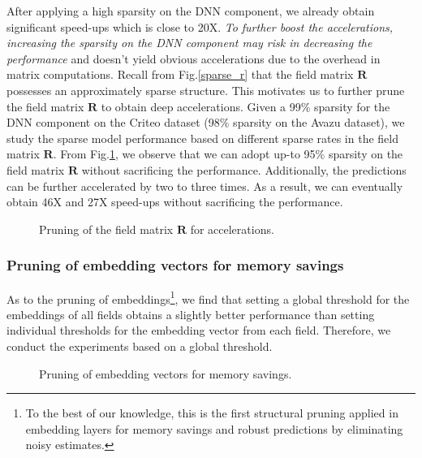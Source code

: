 \documentclass[sigconf]{acmart}
\begin{document}
After applying a high sparsity on the DNN component, we already obtain significant speed-ups which is close to 20X. \emph{To further boost the accelerations, increasing the sparsity on the DNN component may risk in decreasing the performance} and doesn't yield obvious accelerations due to the overhead in matrix computations. Recall from Fig.\ref{sparse_r} that the field matrix $\bm{R}$ possesses an approximately sparse structure. This motivates us to further prune the field matrix $\bm{R}$ to obtain deep accelerations. Given a 99\% sparsity for the DNN component on the Criteo dataset (98\% sparsity on the Avazu dataset), we study the sparse model performance based on different sparse rates in the field matrix $\bm{R}$. From Fig.\ref{prune_fig_Rs}, we observe that we can adopt up-to 95\% sparsity on the field matrix $\bm{R}$ without sacrificing the performance. Additionally, the predictions can be further accelerated by two to three times. As a result, we can eventually obtain 46X and 27X speed-ups without sacrificing the performance. 

\begin{figure}[h!]
\centering
\vspace{-0.1in}
  \vspace{-0.05in}
  \caption{Pruning of the field matrix $\bm{R}$ for accelerations. }
   \label{prune_fig_Rs}
\end{figure}





\subsubsection{\textbf{Pruning of embedding vectors for memory savings}}
As to the pruning of embeddings\footnote{To the best of our knowledge, this is the first structural pruning applied in embedding layers for memory savings and robust predictions by eliminating noisy estimates.}, we find that setting a global threshold for the embeddings of all fields obtains a slightly better performance than setting individual thresholds for the embedding vector from each field. Therefore, we conduct the experiments based on a global threshold. 

\begin{figure}[h!]
\centering
\vspace{-0.1in}
  \label{fig: fm2a} 
  \label{fig: avazu_2b}
   \vspace{-0.05in}
  \caption{Pruning of embedding vectors for memory savings.}
  \label{prune_fig_emb}
\end{figure}
\end{document}
